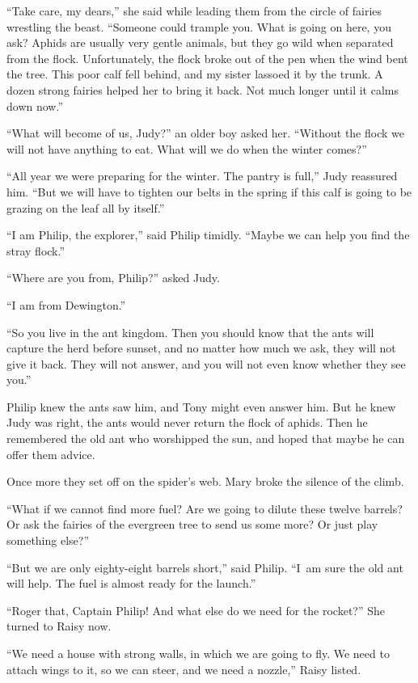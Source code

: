 \documentclass[10pt]{memoir}
\begin{document}
``Take care, my dears,'' she said while leading them from the circle of fairies
wrestling the beast. ``Someone could trample you. What is going on here, you
ask? Aphids are usually very gentle animals, but they go wild when separated
from the flock. Unfortunately, the flock broke out of the pen when the wind
bent the tree. This poor calf fell behind, and my sister lassoed it by the
trunk. A dozen strong fairies helped her to bring it back. Not much longer
until it calms down now.''

``What will become of us, Judy?'' an older boy asked her. ``Without the flock
we will not have anything to eat. What will we do when the winter comes?''

``All year we were preparing for the winter. The pantry is full,'' Judy
reassured him. ``But we will have to tighten our belts in the spring if this
calf is going to be grazing on the leaf all by itself.''

``I am Philip, the explorer,'' said Philip timidly. ``Maybe we can help you
find the stray flock.''

``Where are you from, Philip?'' asked Judy.

``I am from Dewington.''

``So you live in the ant kingdom. Then you should know that the ants will
capture the herd before sunset, and no matter how much we ask, they will not
give it back. They will not answer, and you will not even know whether they see
you.''

Philip knew the ants saw him, and Tony might even answer him. But he knew Judy
was right, the ants would never return the flock of aphids. Then he remembered
the old ant who worshipped the sun, and hoped that maybe he can offer them
advice.

Once more they set off on the spider's web. Mary broke the silence of the
climb.

``What if we cannot find more fuel? Are we going to dilute these twelve
barrels? Or ask the fairies of the evergreen tree to send us some more? Or just
play something else?''

``But we are only eighty-eight barrels short,'' said Philip. ``I~am sure the
old ant will help. The fuel is almost ready for the launch.''

``Roger that, Captain Philip! And what else do we need for the rocket?'' She
turned to Raisy now.

``We need a house with strong walls, in which we are going to fly. We need to
attach wings to it, so we can steer, and we need a nozzle,'' Raisy listed.
\end{document}
